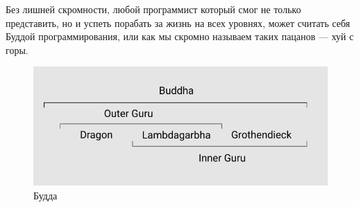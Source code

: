Без лишней скромности, любой программист который смог не только представить, но и успеть порабать за жизнь на всех уровнях, может считать себя Буддой программирования, или как мы скромно называем таких пацанов — хуй с горы.

\begin{figure}[!htbp]
\centerline{\includegraphics[scale=0.46]{buddha.PNG}}
\caption{Будда}
\end{figure}

\normalsize
